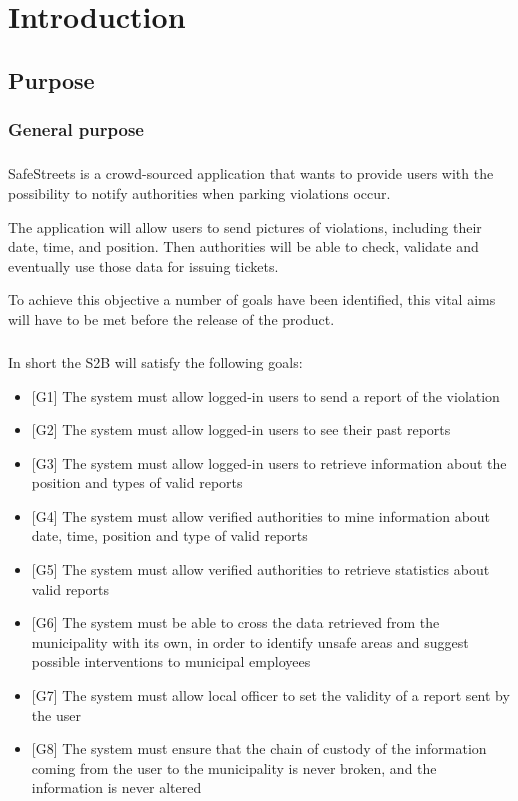 	\chapter{Introduction}
		\section{Purpose}
			\subsection{General purpose}
				\paragraph{}
					SafeStreets is a crowd-sourced application that wants to provide users with the possibility to notify authorities when parking violations occur. 
					
					The application will allow users to send pictures of violations, including their date, time, and position. Then authorities will be able to check, validate and eventually use those data for issuing tickets.
					
					 To achieve this objective a number of goals have been identified, this vital aims will have to be met before the release of the product.
				\paragraph{}
					In short the S2B will satisfy the following goals:
					 \begin{itemize}
					 	\item {[G1]} The system must allow logged-in users to send a report of the violation
					 	\item {[G2]} The system must allow logged-in users to see their past reports
					 	\item {[G3]} The system must allow logged-in users to retrieve information about the position and types of valid reports
					 	\item {[G4]} The system must allow verified authorities to mine information about date, time, position and type of valid reports
					 	\item {[G5]} The system must allow verified authorities to retrieve statistics about valid reports
					 	\item {[G6]} The system must be able to cross the data retrieved from the municipality with its own, in order to identify unsafe areas and suggest possible interventions to municipal employees
					 	\item {[G7]} The system must allow local officer to set the validity of a report sent by the user
					 	\item {[G8]} The system must ensure that the chain of custody of the information coming from the user to the municipality is never broken, and the information is never altered
					 \end{itemize}
